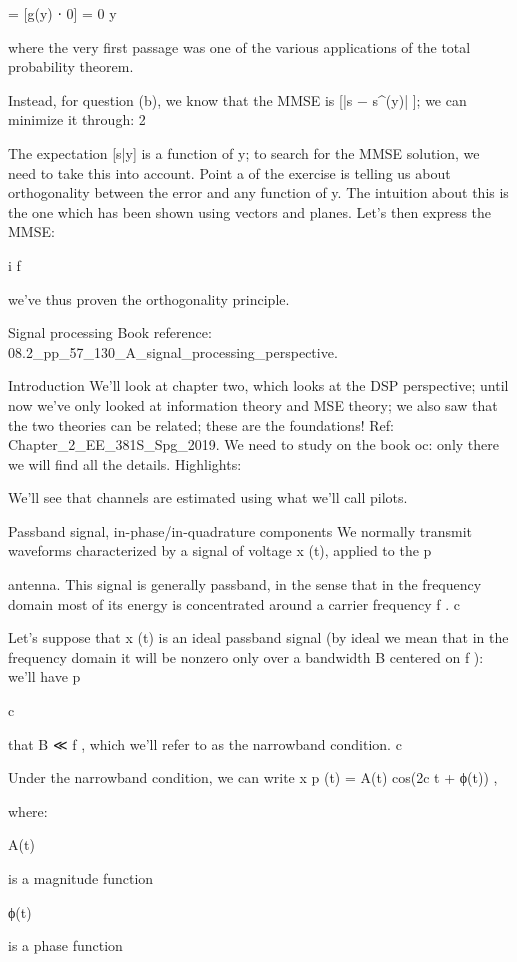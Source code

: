 {= [g(y) ⋅ 0] = 0 y

where the very first passage was one of the various applications of the total probability theorem.

Instead, for question (b), we know that the MMSE is [|s − s^(y)| ]; we can minimize it through:
2

The expectation [s|y] is a function of y; to search for the MMSE solution, we need to take this into account.
Point a of the exercise is telling us about orthogonality between the error and any function of y.
The intuition about this is the one which has been shown using vectors and planes.
Let's then express the MMSE:

i f

we've thus proven the orthogonality principle.

Signal processing Book reference: 08.2_pp_57_130_A_signal_processing_perspective.

Introduction We'll look at chapter two, which looks at the DSP perspective; until now we've only looked at information theory and MSE theory; we also saw that the two theories can be related; these are the foundations!
Ref: Chapter_2_EE_381S_Spg_2019.
We need to study on the book oc: only there we will find all the details.
Highlights:

We'll see that channels are estimated using what we'll call pilots.

Passband signal, in-phase/in-quadrature components We normally transmit waveforms characterized by a signal of voltage x (t), applied to the p

antenna. This signal is generally passband, in the sense that in the frequency domain most of its energy is concentrated around a carrier frequency f .
c

Let's suppose that x (t) is an ideal passband signal (by ideal we mean that in the frequency domain it will be nonzero only over a bandwidth B centered on f ): we'll have p

c

that B ≪ f , which we'll refer to as the narrowband condition.
c

Under the narrowband condition, we can write x p (t) = A(t) cos(2\pif c t + ϕ(t)) ,

where:

A(t)

is a magnitude function

ϕ(t)

is a phase function

}
